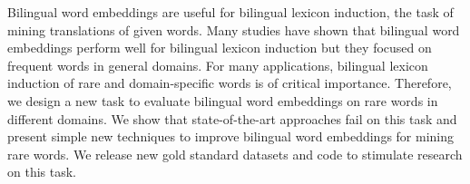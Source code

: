 Bilingual word embeddings are useful for bilingual lexicon induction, the task of mining translations of given words. Many studies have shown that bilingual word embeddings perform well for bilingual lexicon induction but they focused on frequent words in general domains. For many applications, bilingual lexicon induction of rare and domain-specific words is of critical importance. Therefore, we design a new task to evaluate bilingual word embeddings on rare words in different domains. We show that state-of-the-art approaches fail on this task and present simple new techniques to improve bilingual word embeddings for mining rare words. We release new gold standard datasets and code to stimulate research on this task.
